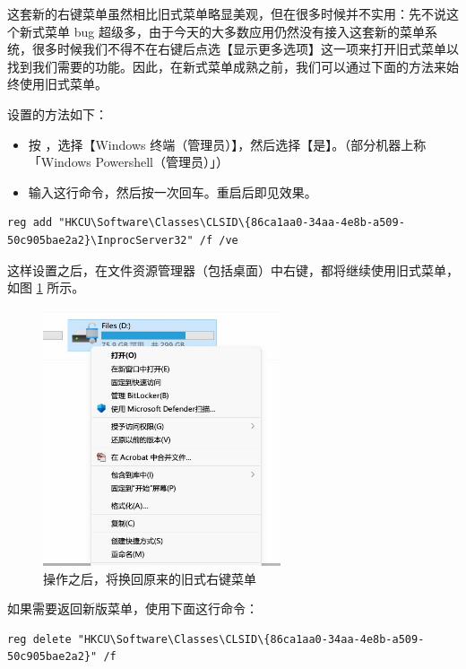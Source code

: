 这套新的右键菜单虽然相比旧式菜单略显美观，但在很多时候并不实用：先不说这个新式菜单 bug 超级多，由于今天的大多数应用仍然没有接入这套新的菜单系统，很多时候我们不得不在右键后点选【显示更多选项】这一项来打开旧式菜单以找到我们需要的功能。因此，在新式菜单成熟之前，我们可以通过下面的方法来始终使用旧式菜单。

设置的方法如下：

\begin{itemize}
  \item 按 ，选择【Windows 终端（管理员）】，然后选择【是】。（部分机器上称「Windows Powershell（管理员）」）
  \item 输入这行命令，然后按一次回车。重启后即见效果。
\end{itemize}

\begin{Verbatim}[fontsize=\footnotesize]
  reg add "HKCU\Software\Classes\CLSID\{86ca1aa0-34aa-4e8b-a509-50c905bae2a2}\InprocServer32" /f /ve
\end{Verbatim}

这样设置之后，在文件资源管理器（包括桌面）中右键，都将继续使用旧式菜单，如图 \ref{Old_menu} 所示。

\begin{figure}[htb!]
  \centering
  \includegraphics[width=7cm]{assets/Old_menu.jpg}
  \caption{操作之后，将换回原来的旧式右键菜单}
  \label{Old_menu}
\end{figure}

如果需要返回新版菜单，使用下面这行命令：

\begin{Verbatim}[fontsize=\small]
  reg delete "HKCU\Software\Classes\CLSID\{86ca1aa0-34aa-4e8b-a509-50c905bae2a2}" /f
\end{Verbatim}
